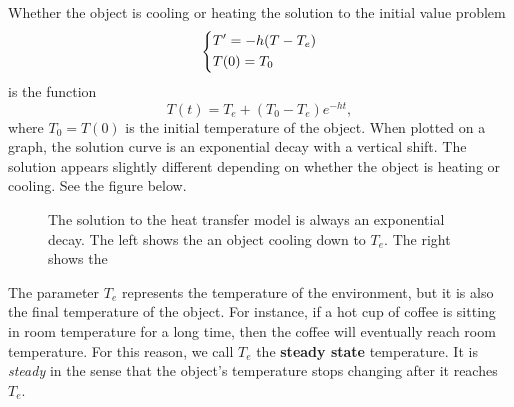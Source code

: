\documentclass[09pt,letterpaper]{article}
\begin{document}
Whether the object is cooling or heating the solution to the initial value problem 
$$
\begin{dcases}
    T' = -h(T-T_e) \\
    T(0)=T_0
\end{dcases}
$$
is the function 
\[
T(t) = T_e + (T_0 - T_e)e^{-ht},
\]
where $T_0=T(0)$ is the initial temperature of the object. When plotted on a graph, the solution curve is an exponential decay with a vertical shift. The solution appears slightly different depending on whether the object is heating or cooling. See the figure below. 
\begin{figure}[H]
    \centering
{}
    \caption{The solution to the heat transfer model is always an exponential decay. The left shows the an object cooling down to $T_e$. The right shows the }
\end{figure}
The parameter $T_e$ represents the temperature of the environment, but it is also the final temperature of the object. For instance, if a hot cup of coffee is sitting in room temperature for a long time, then the coffee will eventually reach room temperature. For this reason, we call $T_e$ the \textbf{steady state} temperature. It is \textit{steady} in the sense that the object's temperature stops changing after it reaches $T_e$. 
\end{document}
